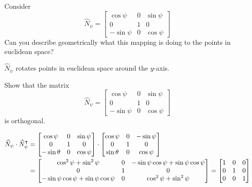 \documentclass{ximera}
\begin{document}
\begin{problem}
  Consider
  \[
  \hat{N}_\psi=\begin{bmatrix}
  \cos\psi & 0 & \sin\psi\\
  0 & 1 & 0\\
  -\sin\psi & 0 & \cos\psi
  \end{bmatrix}
  \]
  Can you describe geometrically what this mapping is doing
  to the points in euclidean space?
  
  
\begin{freeResponse}
$\hat{N}_\psi$ rotates points in euclidean space around the $y$-axis.
\end{freeResponse}

\end{problem}


\begin{problem}
Show that the matrix
\[
\hat{N}_\psi=\begin{bmatrix}
\cos\psi & 0 & \sin\psi\\
0 & 1 & 0\\
-\sin\psi & 0 & \cos\psi
\end{bmatrix}
\]
is orthogonal.

\begin{freeResponse}
\begin{align*}
\widehat{N}_\psi \cdot \widehat{N}_\psi^\intercal
&= \begin{bmatrix}
	\cos\psi & 0 & \sin\psi \\
	0 & 1 & 0 \\
	-\sin\theta & 0 & \cos\psi 
	\end{bmatrix} \cdot
	\begin{bmatrix}
	\cos\psi & 0 & -\sin\psi \\
	0 & 1 & 0 \\
	\sin\theta & 0 & \cos\psi 
	\end{bmatrix}  \\
	&= \begin{bmatrix}
	\cos^{2}\psi + \sin^{2} \psi & 0 & -\sin\psi \cos\psi + \sin\psi \cos\psi \\
	0 &  1 & 0 \\
	 -\sin\psi \cos\psi + \sin\psi \cos\psi & 0 & \cos^{2}\psi + \sin^{2} \psi 
	\end{bmatrix}
	=  \begin{bmatrix}
	1 & 0 & 0 \\
	0 & 1  & 0 \\
	0 & 0 & 1
	\end{bmatrix}
\end{align*}
\end{freeResponse}
\end{problem}
\end{document}
